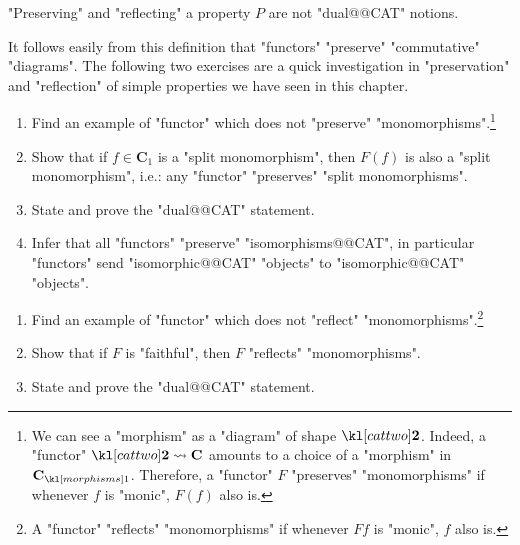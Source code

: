 \documentclass[main.tex]{subfiles}
\begin{document}
\begin{warn}
	"Preserving" and "reflecting" a property $P$ are not "dual@@CAT" notions.
\end{warn}
It follows easily from this definition that "functors" "preserve" "commutative" "diagrams". The following two exercises are a quick investigation in "preservation" and "reflection" of simple properties we have seen in this chapter.
\begin{exer}\label{exer:duality:preserving}
	\begin{enumerate}
        \item Find an example of "functor" which does not "preserve" "monomorphisms".\footnote{We can see a "morphism" as a "diagram" of shape $\cattwo$. Indeed, a "functor" $\cattwo \rightsquigarrow \mathbf{C}$ amounts to a choice of a "morphism" in $\mor{\mathbf{C}}$. Therefore, a "functor" $F$ "preserves" "monomorphisms" if whenever $f$ is "monic", $F(f)$ also is.}
        \item Show that if $f \in \mathbf{C}_1$ is a "split monomorphism", then $F(f)$ is also a "split monomorphism", i.e.: any "functor" "preserves" "split monomorphisms".
        \item State and prove the "dual@@CAT" statement.
        \item Infer that all "functors" "preserve" "isomorphisms@@CAT", in particular "functors" send "isomorphic@@CAT" "objects" to "isomorphic@@CAT" "objects".
    \end{enumerate}
\end{exer}
\begin{exer}\label{exer:duality:reflecting}
	\begin{enumerate}
		\item Find an example of "functor" which does not "reflect" "monomorphisms".\footnote{A "functor" "reflects" "monomorphisms" if whenever $Ff$ is "monic", $f$ also is.}
		\item Show that if $F$ is "faithful", then $F$ "reflects" "monomorphisms".
		\item State and prove the "dual@@CAT" statement.
	\end{enumerate}
\end{exer}
%
\end{document}
